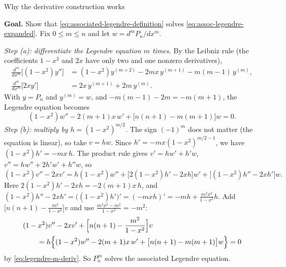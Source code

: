 \documentclass[11pt]{beamer}
\begin{document}
\begin{frame}[allowframebreaks=1.00]{Why the derivative construction works}
\footnotesize

\textbf{Goal.} Show that \eqref{eq:associated-legendre-definition} solves \eqref{eq:assoc-legendre-expanded}. Fix \(0\le m\le n\) and let \(w=d^mP_n/dx^m\).

\emph{Step (a): differentiate the Legendre equation \(m\) times.} By the Leibniz rule (the coefficients
\(1-x^2\) and \(2x\) have only two and one nonzero derivatives),
\begin{align*}
 \frac{d^m}{dx^m}\bigl[(1-x^2)y''\bigr]&=(1-x^2)y^{(m+2)}-2mx\,y^{(m+1)}-m(m-1)\,y^{(m)},\\
 \frac{d^m}{dx^m}\bigl[2xy'\bigr]&=2x\,y^{(m+1)}+2m\,y^{(m)}.
\end{align*}
With \(y=P_n\) and \(y^{(m)}=w\), and \(-m(m-1)-2m=-m(m+1)\), the Legendre equation becomes
\begin{equation}
 (1-x^2)w''-2(m+1)x\,w'+\bigl[n(n+1)-m(m+1)\bigr]w=0 .
 \label{eq:legendre-m-deriv}
\end{equation}
\emph{Step (b): multiply by \(h=(1-x^2)^{m/2}\).} The sign \((-1)^m\) does not matter (the equation is linear), so
take \(v=hw\). Since \(h'=-mx(1-x^2)^{m/2-1}\), we have \((1-x^2)h'=-mx\,h\). The product rule gives
\(v'=hw'+h'w\), \(v''=hw''+2h'w'+h''w\), so
\[
 (1-x^2)v''-2xv'=h(1-x^2)w''+\bigl[2(1-x^2)h'-2xh\bigr]w'+\bigl[(1-x^2)h''-2xh'\bigr]w .
\]
Here \(2(1-x^2)h'-2xh=-2(m+1)x\,h\), and \((1-x^2)h''-2xh'=\bigl((1-x^2)h'\bigr)'=(-mxh)'=-mh+\frac{m^2x^2}{1-x^2}h\). Add
\(\bigl[n(n+1)-\frac{m^2}{1-x^2}\bigr]v\) and use \(\frac{m^2x^2-m^2}{1-x^2}=-m^2\):
\begin{align*}
 &(1-x^2)v''-2xv'+\Bigl[n(n+1)-\frac{m^2}{1-x^2}\Bigr]v\\
 &\qquad=h\Bigl\{(1-x^2)w''-2(m+1)x\,w'+\bigl[n(n+1)-m(m+1)\bigr]w\Bigr\}=0
\end{align*}
by \eqref{eq:legendre-m-deriv}. So \(P_n^m\) solves the associated Legendre equation.
\end{frame}
\end{document}
